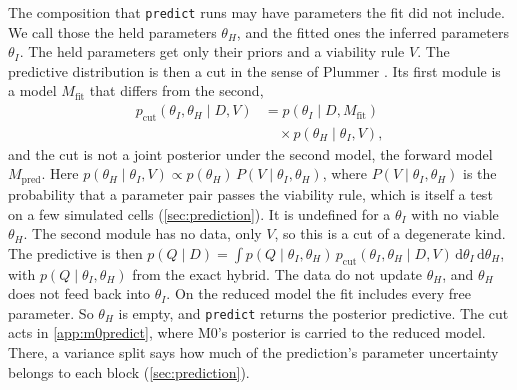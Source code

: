 The composition that \texttt{predict} runs may have parameters the fit did not include. We call
those the held parameters $\theta_H$, and the fitted ones the inferred parameters $\theta_I$.
The held parameters get only their priors and a viability rule $V$. The predictive distribution is
then a cut in the sense of Plummer
\cite{plummer2015cuts}. Its first module is a model $M_{\mathrm{fit}}$ that differs from the second,
\begin{equation}
  \begin{aligned}
  p_{\mathrm{cut}}(\theta_I, \theta_H \mid D, V)
  &= p(\theta_I \mid D, M_{\mathrm{fit}}) \\
  &\quad \times p(\theta_H \mid \theta_I, V),
  \end{aligned}
\end{equation}
and the cut is not a joint posterior under the second model, the forward model $M_{\mathrm{pred}}$.
Here $p(\theta_H \mid \theta_I, V) \propto p(\theta_H)\, P(V \mid \theta_I, \theta_H)$, where
$P(V \mid \theta_I, \theta_H)$ is the probability that a parameter pair passes the viability
rule, which is itself a test on a few simulated cells (\cref{sec:prediction}). It is undefined
for a $\theta_I$ with no viable $\theta_H$. The second module has no data, only $V$, so this is
a cut of a degenerate kind. The predictive is then
$p(Q \mid D) = \int p(Q \mid \theta_I, \theta_H)\, p_{\mathrm{cut}}(\theta_I, \theta_H \mid D, V)\,
\mathrm{d}\theta_I\, \mathrm{d}\theta_H$, with $p(Q \mid \theta_I, \theta_H)$ from the exact hybrid.
The data do not update $\theta_H$, and $\theta_H$ does not feed back into $\theta_I$. On the reduced model the fit
includes every free parameter. So $\theta_H$ is empty, and \texttt{predict} returns the posterior
predictive. The cut acts in \cref{app:m0predict}, where M0's posterior is carried to the reduced
model. There, a variance split says how much of the prediction's parameter uncertainty belongs
to each block (\cref{sec:prediction}).

